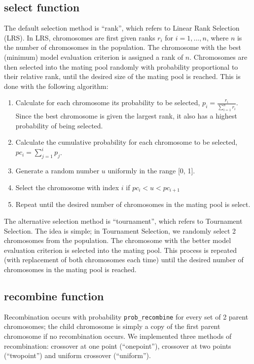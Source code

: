\documentclass[11pt]{article}
\begin{document}
\subsection*{select function}
The default selection method is ``rank'', which refers to Linear Rank Selection (LRS). In LRS, chromosomes are first given ranks $r_i$ for $i = 1, ..., n$, where $n$ is the number of chromosomes in the population. The chromosome with the best (minimum) model evaluation criterion is assigned a rank of $n$. Chromosomes are then selected into the mating pool randomly with probability proportional to their relative rank, until the desired size of the mating pool is reached. This is done with the following algorithm:
\begin{enumerate}
\item Calculate for each chromosome its probability to be selected, $p_i = \frac{r_i}{\sum\limits_{i=1}^n{r_i}}$. Since the best chromosome is given the largest rank, it also has a highest probability of being selected.
\item Calculate the cumulative probability for each chromosome to be selected, $pc_i = \sum\limits_{j=1}^i{p_j}$.
\item Generate a random number $u$ uniformly in the range [0, 1].
\item Select the chromosome with index $i$ if $pc_i < u < pc_{i+1}$
\item Repeat until the desired number of chromosomes in the mating pool is select.
\end{enumerate}

The alternative selection method is ``tournament'', which refers to Tournament Selection. The idea is simple; in Tournament Selection, we randomly select 2 chromosomes from the population. The chromosome with the better model evaluation criterion is selected into the mating pool. This process is repeated (with replacement of both chromosomes each time) until the desired number of chromosomes in the mating pool is reached.

\subsection*{recombine function}
Recombination occurs with probability \texttt{prob\_recombine} for every set of 2 parent chromosomes; the child chromosome is simply a copy of the first parent chromosome if no recombination occurs. We implemented three methods of recombination: crossover at one point (``onepoint''), crossover at two points (``twopoint'') and uniform crossover (``uniform'').
\end{document}
